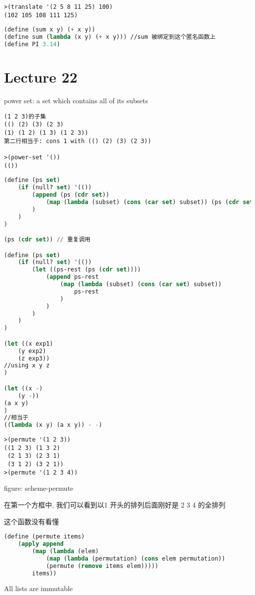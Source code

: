 \documentclass{article}
\begin{document}
\begin{verbatim}
>(translate '(2 5 8 11 25) 100)
(102 105 108 111 125)
\end{verbatim}

\begin{lstlisting}[language = Lisp]
(define (sum x y) (+ x y))
(define sum (lambda (x y) (+ x y))) //sum 被绑定到这个匿名函数上
(define PI 3.14)
\end{lstlisting}

\section{Lecture 22}
power set: a set which contains all of its subsets
\begin{verbatim}
(1 2 3)的子集
(() (2) (3) (2 3)
(1) (1 2) (1 3) (1 2 3))
第二行相当于: cons 1 with (() (2) (3) (2 3))

>(power-set '())
(())
\end{verbatim}

\begin{lstlisting}[language = Lisp]
(define (ps set)
	(if (null? set) '(())
		(append (ps (cdr set))
			(map (lambda (subset) (cons (car set) subset)) (ps (cdr set)))
		)
	)
)

(ps (cdr set)) // 重复调用

(define (ps set)
	(if (null? set) '(())
		(let ((ps-rest (ps (cdr set))))
			(append ps-rest 
				(map (lambda (subset) (cons (car set) subset)) 
					ps-rest
				)
			)
		)
	)
)

(let ((x exp1)
	(y exp2)
	(z exp3))
//using x y z
)

(let ((x -)
	(y -))
(a x y)
)
//相当于
((lambda (x y) (a x y)) - -)
\end{lstlisting}

\begin{verbatim}
>(permute '(1 2 3))
((1 2 3) (1 3 2) 
 (2 1 3) (2 3 1)
 (3 1 2) (3 2 1))
>(permute '(1 2 3 4))
\end{verbatim}
figure: scheme-permute
 
在第一个方框中, 我们可以看到以1 开头的排列后面刚好是 2 3 4 的全排列

这个函数没有看懂
\begin{lstlisting}[language = Lisp]
(define (permute items)
	(apply append
		(map (lambda (elem)
			(map (lambda (permutation) (cons elem permutation))
			(permute (remove items elem)))))
		items))
\end{lstlisting}

All lists are immutable
\end{document}
